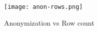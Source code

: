 \begin{figure}[ht]
    \centering
    \texttt{[image: anon-rows.png]}
    \caption{Anonymization vs Row count}\label{fig:anon_rows}
\end{figure}